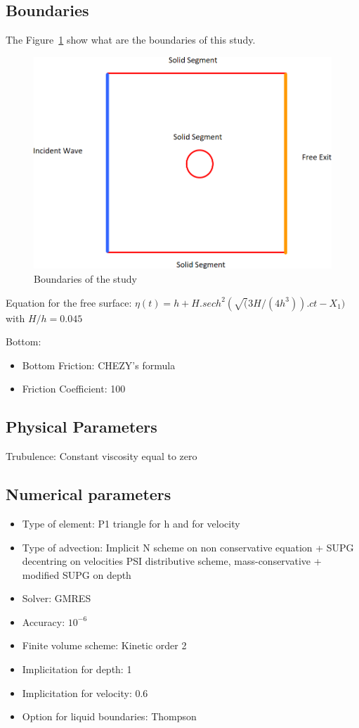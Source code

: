 \subsection{Boundaries}

The Figure~\ref{fig:island:boundaries} show what are the boundaries of this
study.
\begin{figure}
\centering
\includegraphics[width=.6\textwidth]{img/boundaries.png}
\caption{Boundaries of the study}\label{fig:island:boundaries}
\end{figure}

Equation for the free surface:
$\eta(t)= h+H.sech^{2}(\sqrt(3H/(4h^{3})).ct-X_{1})$ with $H/h=0.045$

Bottom:
\begin{itemize}
\item Bottom Friction: CHEZY's formula
\item Friction Coefficient: 100
\end{itemize}

\subsection{Physical Parameters}

Trubulence: Constant viscosity equal to zero

\subsection{Numerical parameters}

\begin{itemize}
\item Type of element: P1 triangle for h and for velocity
\item Type of advection: Implicit N scheme on non conservative equation + SUPG decentring on velocities PSI distributive scheme, mass-conservative + modified SUPG on depth
\item Solver: GMRES
\item Accuracy: $10^{-6}$
\item Finite volume scheme:  Kinetic order 2
\item Implicitation for depth:   1
\item Implicitation for velocity:  0.6
\item Option for liquid boundaries:  Thompson
\end{itemize}

